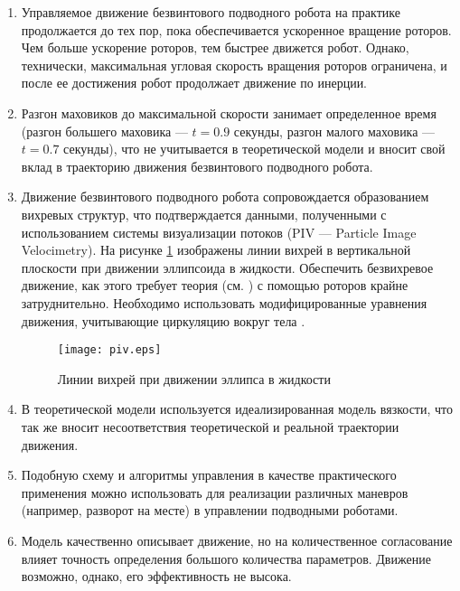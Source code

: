 \begin{enumerate}
	\item	Управляемое движение безвинтового подводного робота на практике продолжается до тех пор, пока обеспечивается ускоренное вращение роторов. Чем больше ускорение роторов, тем быстрее движется робот. Однако, технически, максимальная угловая скорость вращения роторов ограничена, и после ее достижения робот продолжает движение по инерции.
	\item Разгон маховиков до максимальной скорости занимает определенное время (разгон большего маховика --- $t=0.9$ секунды, разгон малого маховика --- $t=0.7$ секунды), что не учитывается в теоретической модели и вносит свой вклад в траекторию движения безвинтового подводного робота.
	\item	Движение безвинтового подводного робота сопровождается образованием вихревых структур, что подтверждается данными, полученными с использованием системы визуализации потоков (PIV --- Particle Image Velocimetry). На рисунке \ref{piv} изображены линии вихрей в вертикальной плоскости при движении эллипсоида в жидкости. Обеспечить безвихревое движение, как этого требует теория (см. \cite{Vetchanin_Mamaev_Tenenev_RCD_2013, Ramodanov_Tenenev_Treschev_RCD_2012}) с помощью роторов крайне затруднительно. Необходимо использовать модифицированные уравнения движения, учитывающие циркуляцию вокруг тела \cite{Kilin_Vetchanin_DAN_2016}.
	
	\begin{figure}[h!]
		\begin{center}
			\texttt{[image: piv.eps]}
			\caption{Линии вихрей при движении эллипса в жидкости} \label{piv}
		\end{center}
	\end{figure}
	
	\item В теоретической модели используется идеализированная модель вязкости, что так же вносит несоответствия теоретической и реальной траектории движения.
	\item Подобную схему и алгоритмы управления в качестве практического применения можно использовать для реализации различных маневров (например, разворот на месте) в управлении подводными роботами.
	\item Модель качественно описывает движение, но на количественное согласование влияет точность определения большого количества параметров. Движение возможно, однако, его эффективность не высока.

\end{enumerate}

